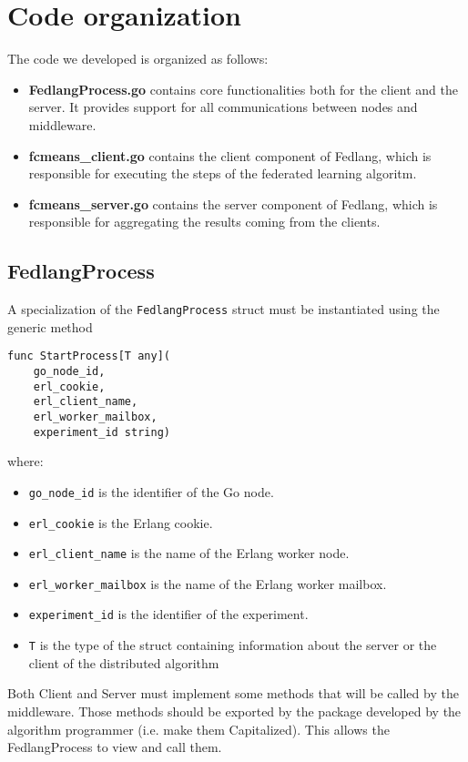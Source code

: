 \chapter{Code organization}
The code we developed is organized as follows:
\begin{itemize}
\item \textbf{FedlangProcess.go} contains core functionalities both for the client and the server. It provides support for all communications 
between nodes and middleware.
\item \textbf{fcmeans\_client.go} contains the client component of Fedlang, which is responsible for executing the steps of the federated learning algoritm.
\item \textbf{fcmeans\_server.go} contains the server component of Fedlang, which is responsible for aggregating the results coming from the clients.
\end{itemize}

\section{FedlangProcess}
A specialization of the \texttt{FedlangProcess} struct must be instantiated using the generic method 
\begin{verbatim}
func StartProcess[T any](
	go_node_id, 
	erl_cookie, 
	erl_client_name, 
	erl_worker_mailbox, 
	experiment_id string)
\end{verbatim}
where:
\begin{itemize}
	\item \texttt{go\_node\_id} is the identifier of the Go node.
	\item \texttt{erl\_cookie} is the Erlang cookie.
	\item \texttt{erl\_client\_name} is the name of the Erlang worker node.
	\item \texttt{erl\_worker\_mailbox} is the name of the Erlang worker mailbox.
	\item \texttt{experiment\_id} is the identifier of the experiment.
	\item \texttt{T} is the type of the struct containing information about the server or the client of the distributed algorithm 
\end{itemize}

Both Client and Server must implement some methods that will be called by the middleware. Those methods should be exported by the package developed by the algorithm programmer (i.e. make them Capitalized). This allows the FedlangProcess to view and call them.

